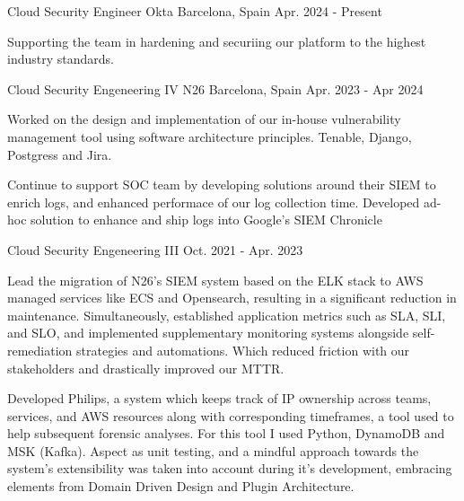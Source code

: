 
\begin{cventries}
	\cventry
	{Cloud Security Engineer} %
	{Okta} %
	{Barcelona, Spain} %
	{Apr. 2024 - Present} %
	{
		\begin{cvitems} %
			\item {Supporting the team in hardening and securiing our platform to the highest industry standards.}
		\end{cvitems}
	}
	\cventry
	{Cloud Security Engeneering IV} %
	{N26} %
	{Barcelona, Spain} %
	{Apr. 2023 - Apr 2024} %
	{
		\begin{cvitems} %
            \item {Worked on the design and implementation of our in-house vulnerability management tool using software architecture principles. Tenable, Django, Postgress and Jira.}
			\item {Continue to support SOC team by developing solutions around their SIEM to enrich logs, and enhanced performace of our log collection time. Developed ad-hoc solution to enhance and ship logs into Google's SIEM Chronicle }
		\end{cvitems}
	}

	\cventry
	{Cloud Security Engeneering III} %
	{} %
	{} %
	{Oct. 2021 - Apr. 2023} %
	{
		\begin{cvitems} %
			\item {Lead the migration of N26's SIEM system based on the ELK stack to AWS managed services like ECS and Opensearch, resulting in a significant reduction in maintenance. Simultaneously, established application metrics such as SLA, SLI, and SLO, and implemented supplementary monitoring systems alongside self-remediation strategies and automations. Which reduced friction with our stakeholders and drastically improved our MTTR.}
			\item {Developed Philips, a system which keeps track of IP ownership across teams, services, and AWS resources along with corresponding timeframes, a tool used to help subsequent forensic analyses. For this tool I used Python, DynamoDB and MSK (Kafka). Aspect as unit testing, and a mindful approach towards the system's extensibility was taken into account during it's development, embracing elements from Domain Driven Design and Plugin Architecture.}
		\end{cvitems}
	}


\end{cventries}
